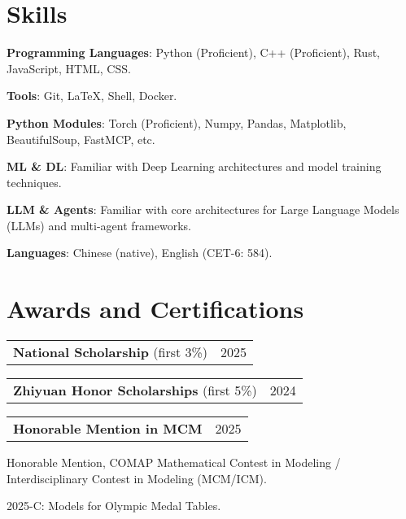 \documentclass[letterpaper,11pt]{article}
\makeatletter
\newcommand{\twopartheader}[2]{
  \vspace{-2pt}\noindent
  \begin{tabular*}{\textwidth}{l@{\extracolsep{\fill}}r}
    #1 & #2 \\
  \end{tabular*}\vspace{-7pt}
}
\makeatother
\begin{document}
\section{Skills}
\textbf{Programming Languages}: Python (Proficient), C++ (Proficient), Rust, JavaScript, HTML, CSS.

\textbf{Tools}: Git, LaTeX, Shell, Docker.

\textbf{Python Modules}: Torch (Proficient), Numpy, Pandas, Matplotlib, BeautifulSoup, FastMCP, etc.

\textbf{ML \& DL}: Familiar with Deep Learning architectures and model training techniques.

\textbf{LLM \& Agents}: Familiar with core architectures for Large Language Models (LLMs) and multi-agent frameworks. 

\textbf{Languages}: Chinese (native), English (CET-6: 584).




\section{Awards and Certifications}

\twopartheader{\textbf{National Scholarship} (first 3\%)}{2025}
\newline

\twopartheader{\textbf{Zhiyuan Honor Scholarships} (first 5\%)}{2024}
\newline

\twopartheader{\textbf{Honorable Mention in MCM}}{2025}

Honorable Mention, COMAP Mathematical Contest in Modeling / Interdisciplinary Contest in Modeling (MCM/ICM).

2025-C: Models for Olympic Medal Tables.
\end{document}
